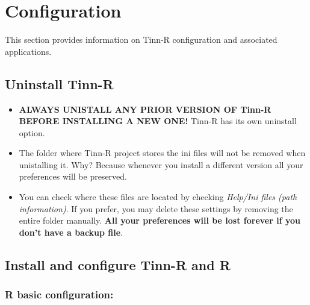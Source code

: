
\hypertarget{basic_configuration}{}
\section{Configuration}

This section provides information on Tinn-R configuration and associated
applications.


\subsection{Uninstall Tinn-R}

\begin{itemize}
  \item \textbf{ALWAYS UNISTALL ANY PRIOR VERSION OF Tinn-R BEFORE
      INSTALLING A NEW ONE!} Tinn-R has its own uninstall option.
  \item The folder where Tinn-R project stores the ini files will
    not be removed when unistalling it. Why? Because whenever you
    install a different version all your preferences will be
    preserved.
  \item You can check where these files are located by checking
    \textit{Help/Ini files (path information)}. If you prefer,
    you may delete these settings by removing the entire folder manually.
    \textbf{All your preferences will be lost forever if you don't
      have a backup file}.
\end{itemize}


\hypertarget{basic_configuration_installconfigure}{}
\subsection{Install and configure Tinn-R and R}


\subsubsection{R basic configuration:}\\

